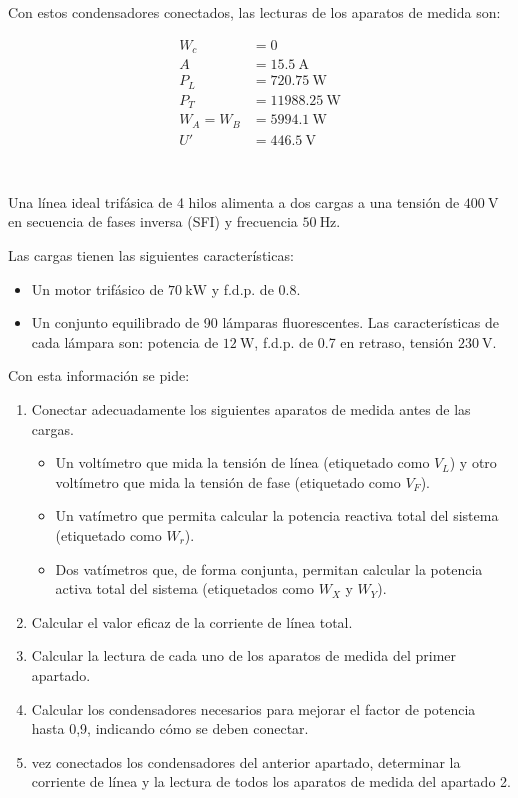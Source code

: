 \documentclass[12pt]{article}
\begin{document}
Con estos condensadores conectados, las lecturas de los aparatos de
medida son:

\begin{align*}
  W_c &= 0\\
  A &= \SI{15.5}{\ampere}\\
  P_L &= \SI{720.75}{\watt}\\
  P_T &= \SI{11988.25}{\watt}\\
  W_A = W_B &= \SI{5994.1}{\watt}\\
  U' &= \SI{446.5}{\volt}\\  
\end{align*}

\clearpage

\section{}

Una línea ideal trifásica de 4 hilos alimenta a dos cargas a una
tensión de $\SI{400}{\volt}$ en secuencia de fases inversa (SFI) y
frecuencia $\SI{50}{\hertz}$.

Las cargas tienen las siguientes características:

\begin{itemize}
\item Un motor trifásico de $\SI{70}{\kilo\watt}$ y f.d.p. de 0.8.
\item Un conjunto equilibrado de 90 lámparas fluorescentes. Las
  características de cada lámpara son: potencia de $\SI{12}{\watt}$,
  f.d.p. de 0.7 en retraso, tensión $\SI{230}{\volt}$.
\end{itemize}

Con esta información se pide:

\begin{enumerate}
\item Conectar adecuadamente los siguientes aparatos de medida antes
  de las cargas.
  \begin{itemize}
  \item Un voltímetro que mida la tensión de línea (etiquetado como
    $V_L$) y otro voltímetro que mida la tensión de fase (etiquetado
    como $V_F$).
  \item Un vatímetro que permita calcular la potencia reactiva total
    del sistema (etiquetado como $W_r$).
  \item Dos vatímetros que, de forma conjunta, permitan calcular la
    potencia activa total del sistema (etiquetados como $W_X$ y
    $W_Y$).
  \end{itemize}
\item Calcular el valor eficaz de la corriente de línea
  total.
\item Calcular la lectura de cada uno de los aparatos
  de medida del primer apartado.
\item Calcular los condensadores necesarios para
  mejorar el factor de potencia hasta 0,9, indicando cómo se deben
  conectar.
\item vez conectados los condensadores del anterior
  apartado, determinar la corriente de línea y la lectura de todos los
  aparatos de medida del apartado 2.
\end{enumerate}
\end{document}
